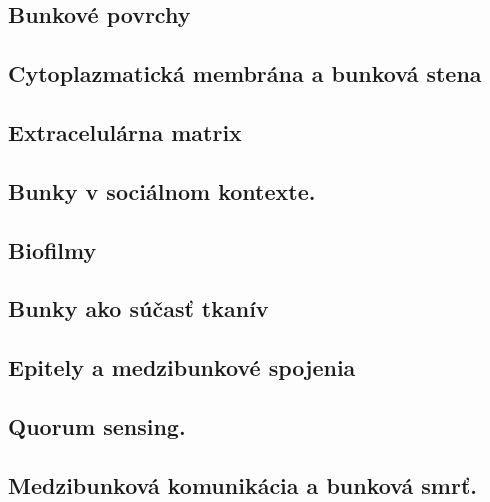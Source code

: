 \subsection{Bunkové povrchy}

\subsection{Cytoplazmatická membrána a bunková stena}

\subsection{Extracelulárna matrix}

\subsection{Bunky v sociálnom kontexte.}

\subsection{Biofilmy}

\subsection{Bunky ako súčasť tkanív}

\subsection{Epitely a medzibunkové spojenia}

\subsection{Quorum sensing.}

\subsection{Medzibunková komunikácia a bunková smrť.}

